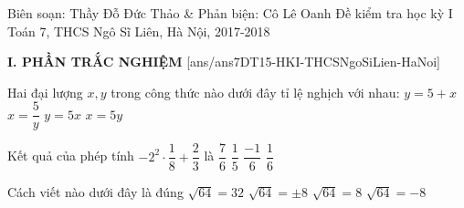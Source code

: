 
	\begin{name}
		{Biên soạn: Thầy Đỗ Đức Thảo \& Phản biện: Cô Lê Oanh}
		{Đề kiểm tra học kỳ I Toán 7, THCS Ngô Sĩ Liên, Hà Nội, 2017-2018}
	\end{name}
	\noindent\textbf{I. PHẦN TRẮC NGHIỆM}
	\setcounter{ex}{0}
	[ans/ans7DT15-HKI-THCSNgoSiLien-HaNoi]
	
	\begin{ex}%
		Hai đại lượng $x,y$ trong công thức nào dưới đây tỉ lệ nghịch với nhau:
		\choice
		{$y=5+x$}
		{\True $x=\dfrac{5}{y}$}
		{$y=5x$}
		{$x=5y$}
	\end{ex}
	\begin{ex}%
		Kết quả của phép tính $-2^2\cdot \dfrac{1}{8}+\dfrac{2}{3}$ là
		\choice
		{$\dfrac{7}{6}$}
		{$\dfrac{1}{5}$}
		{$\dfrac{-1}{6}$}
		{\True $\dfrac{1}{6}$} 
	\end{ex}
	\begin{ex}%
		Cách viết nào dưới đây là đúng
		\choice
		{$\sqrt{64}=32$}
		{$\sqrt{64}=\pm 8$}
		{\True $\sqrt{64}=8$}
		{$\sqrt{64}=-8$}
	\end{ex}

